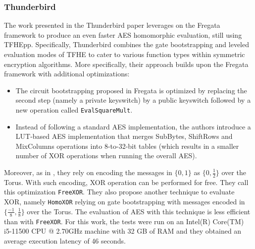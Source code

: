 \subsubsection{Thunderbird \cite{TCHES:WLWLLW24}}
\label{sec:thunderbird}
The work presented in the Thunderbird paper leverages on the Fregata framework to produce an even faster AES homomorphic evaluation, still using TFHEpp. Specifically, Thunderbird combines the gate bootstrapping and leveled evaluation modes of TFHE to cater to various function types within symmetric encryption algorithms. More specifically, their approach builds upon the Fregata framework with additional optimizations:
\begin{itemize}
    \item The circuit bootstrapping proposed in Fregata is optimized by replacing the second step (namely a private keyswitch) by a public keyswitch followed by a new operation called \texttt{EvalSquareMult}.
    \item  Instead of following a standard AES implementation, the authors introduce a LUT-based AES implementation that merges SubBytes, ShiftRows and MixColumns operations into 8-to-32-bit tables (which results in a smaller number of XOR operations when running the overall AES).
\end{itemize}
Moreover, as in \cite{ISC:WWLLL23}, they rely on encoding the messages in $\{0, 1\}$ as $\{0, \frac{1}{2}\}$ over the Torus. With such encoding, XOR operation can be performed for free. They call this optimization \texttt{FreeXOR}. They also propose another technique to evaluate XOR, namely \texttt{HomoXOR} relying on gate bootstrapping with messages encoded in $\{\frac{-1}{8}, \frac{1}{8}\}$ over the Torus. The evaluation of AES with this technique is less efficient than with \texttt{FreeXOR}. For this work, the tests were run on an Intel(R) Core(TM) i5-11500 CPU @ 2.70GHz machine with 32 GB of RAM and they obtained an average execution latency of 46 seconds.



